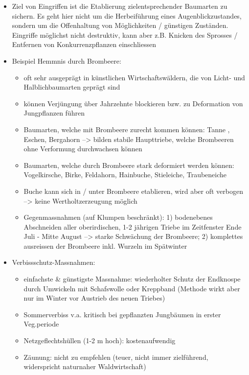 \documentclass{article}
\begin{document}
\begin{itemize}
   \item Ziel von Eingriffen ist die Etablierung zielentsprechender Baumarten zu sichern. Es geht hier nicht um die Herbeiführung eines Augenblickzustandes, sondern um die Offenhaltung von Möglichkeiten / günstigen Zuständen. Eingriffe möglichst nicht destruktiv, kann aber z.B. Knicken des Sprosses / Entfernen von Konkurrenzpflanzen einschliessen

   \item Beispiel Hemmnis durch Brombeere:
   
    \begin{itemize}
    	\item oft sehr ausgeprägt in künstlichen Wirtschaftswäldern, die von Licht- und Halblichbaumarten geprägt sind
    	\item können Verjüngung über Jahrzehnte blockieren bzw. zu Deformation von Jungpflanzen führen
    	\item Baumarten, welche mit Brombeere zurecht kommen können: Tanne , Eschen, Bergahorn --> bilden stabile Haupttriebe, welche Brombeeren ohne Verformung durchwachsen können
    	\item Baumarten, welche durch Brombeere stark deformiert werden können: Vogelkirsche, Birke, Feldahorn, Hainbuche, Stieleiche, Traubeneiche
    	\item Buche kann sich in / unter Brombeere etablieren, wird aber oft verbogen --> keine Wertholtzerzeugung möglich
    	\item Gegenmassnahmen (auf Klumpen beschränkt): 1) bodenebenes Abschneiden aller oberirdischen, 1-2 jährigen Triebe im Zeitfenster Ende Juli - Mitte August --> starke Schwächung der Brombeere; 2) komplettes ausreissen der Brombeere inkl. Wurzeln im Spätwinter 	
    \end{itemize}
   
    \item Verbissschutz-Massnahmen:
    
      \begin{itemize}
        \item einfachste \& günstigste Massnahme: wiederholter Schutz der Endknospe durch Umwickeln mit Schafswolle oder Kreppband (Methode wirkt aber nur im Winter vor Austrieb des neuen Triebes)
        \item Sommerverbiss v.a. kritisch bei gepflanzten Jungbäumen in erster Veg.periode
        \item Netzgeflechtshüllen (1-2 m hoch): kostenaufwendig
        \item Zäunung: nicht zu empfehlen (teuer, nicht immer zielführend, widerspricht naturnaher Waldwirtschaft)    
      \end{itemize}
    

\end{itemize}
\end{document}
